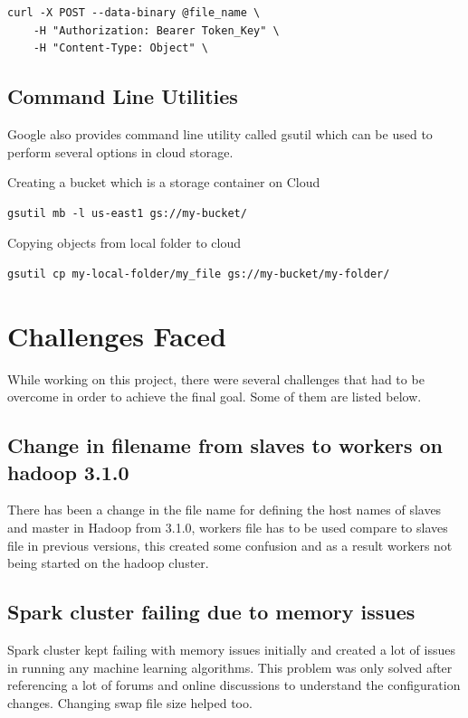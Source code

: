 \begin{verbatim}
curl -X POST --data-binary @file_name \
    -H "Authorization: Bearer Token_Key" \
    -H "Content-Type: Object" \
\end{verbatim}

\subsection{Command Line Utilities}

Google also provides command line utility called gsutil which can be
used to perform several options in cloud storage.

Creating a bucket which is a storage container on Cloud

\begin{verbatim}
gsutil mb -l us-east1 gs://my-bucket/
\end{verbatim}

Copying objects from local folder to cloud

\begin{verbatim}
gsutil cp my-local-folder/my_file gs://my-bucket/my-folder/
\end{verbatim}

\section{Challenges Faced}

While working on this project, there were several challenges that had
to be overcome in order to achieve the final goal. Some of them are 
listed below. 

\subsection{Change in filename from slaves to workers on hadoop 3.1.0}

There has been a change in the file name for defining the host names
of slaves and master in Hadoop from 3.1.0, workers file has to be used
compare to slaves file in previous versions, this created some
confusion and as a result workers not being started on the hadoop
cluster.

\subsection{Spark cluster failing due to memory issues}

Spark cluster kept failing with memory issues initially and created a
lot of issues in running any machine learning algorithms. This problem
was only solved after referencing a lot of forums and online
discussions to understand the configuration changes. Changing swap
file size helped too.

